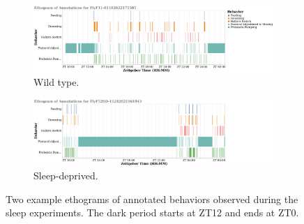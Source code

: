 \begin{figure}[b!]
	\centering
	\begin{subfigure}[ht!]{0.9\linewidth}
		\centering\includegraphics[width=\linewidth]{figures/FlyF11-01182022175505_annotation_ethogram.pdf}
		\caption{Wild type.}
	\end{subfigure}%

	\centering
	\begin{subfigure}[ht!]{0.9\linewidth}
		\centering\includegraphics[width=\linewidth]{figures/FlyF52SD-11242021161943_annotation_ethogram.pdf}
		\caption{Sleep-deprived.}
	\end{subfigure}%
	\caption[Two example ethograms of annotated behaviors observed during the sleep experiments.]{Two example ethograms of annotated behaviors observed during the sleep experiments. The dark period starts at ZT12 and ends at ZT0. \label{figure:example-ethograms}}
\end{figure}
